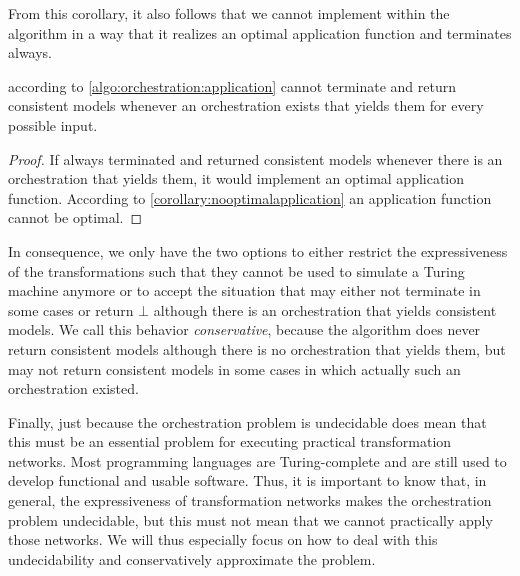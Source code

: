 From this corollary, it also follows that we cannot implement  within the  algorithm in a way that it realizes an optimal application function and terminates always.

\begin{corollary}
     according to \autoref{algo:orchestration:application} cannot terminate and return consistent models whenever an orchestration exists that yields them for every possible input.
\end{corollary}
\begin{proof}
    If  always terminated and returned consistent models whenever there is an orchestration that yields them, it would implement an optimal application function. %
    According to \autoref{corollary:nooptimalapplication} an application function cannot be optimal.
\end{proof}

In consequence, we only have the two options to either restrict the expressiveness of the transformations such that they cannot be used to simulate a Turing machine anymore or to accept the situation that  may either not terminate in some cases or return $\bot$ although there is an orchestration that yields consistent models.
We call this behavior \emph{conservative}, because the algorithm does never return consistent models although there is no orchestration that yields them, but may not return consistent models in some cases in which actually such an orchestration existed.

Finally, just because the orchestration problem is undecidable does mean that this must be an essential problem for executing practical transformation networks.
Most programming languages are Turing-complete and are still used to develop functional and usable software.
Thus, it is important to know that, in general, the expressiveness of transformation networks makes the orchestration problem undecidable, but this must not mean that we cannot practically apply those networks.
We will thus especially focus on how to deal with this undecidability and conservatively approximate the problem.

